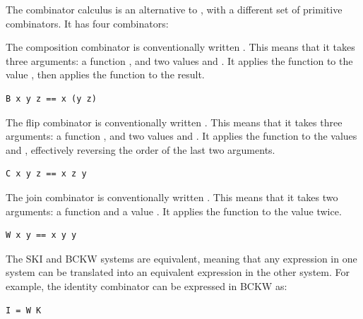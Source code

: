 The  combinator calculus is an alternative to , with a different set of primitive combinators.  It has four combinators:

The composition combinator  is conventionally written .  This means that it takes three arguments: a function , and two values  and .  It applies the function  to the value , then applies the function  to the result.

\begin{lstlisting}[style=listingcomb,frame=tb]
B x y z == x (y z)
\end{lstlisting}

The flip combinator  is conventionally written .  This means that it takes three arguments: a function , and two values  and .  It applies the function  to the values  and , effectively reversing the order of the last two arguments.

\begin{lstlisting}[style=listingcomb,frame=tb]
C x y z == x z y
\end{lstlisting}

The join combinator  is conventionally written .  This means that it takes two arguments: a function  and a value .  It applies the function  to the value  twice.

\begin{lstlisting}[style=listingcomb,frame=tb]
W x y == x y y
\end{lstlisting}






The \textsc{SKI} and \textsc{BCKW} systems are equivalent, meaning that any expression in one system can be translated into an equivalent expression in the other system.  For example, the identity combinator  can be expressed in \textsc{BCKW} as:

\begin{lstlisting}[style=listingcomb]
I = W K

\end{lstlisting}

